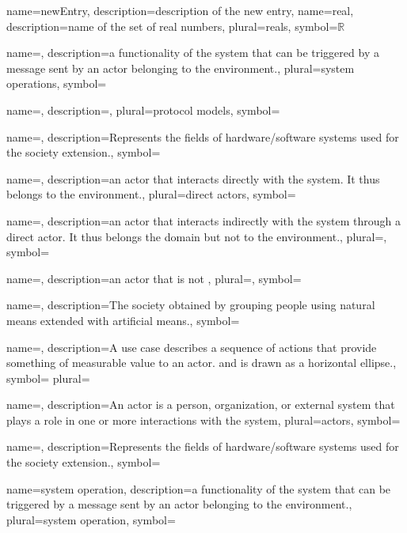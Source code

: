 {name={newEntry},
description={description of the new entry},
}
{name={real},
description={name of the set of real numbers},
plural={reals},
symbol={\ensuremath{\mathbb{R}}}
}

{name={},
description={a functionality of the system that can be triggered by a message sent by an actor belonging to the environment.},
plural={system operations},
symbol={}
}

{name={},
description={},
plural={protocol models},
symbol={}
}

{name={},
description={Represents the fields of hardware/software
systems used for the society extension.},
symbol={}
}

{name={},
description={an actor that interacts directly with the system. It thus belongs to the environment.},
plural={direct actors},
symbol={}
}

{name={},
description={an actor that interacts indirectly with the system through a direct actor. It thus belongs the domain but not to the environment.},
plural={},
symbol={}
}

{name={},
description={an actor that is not },
plural={},
symbol={}
}

{name={},
description={The society obtained by grouping people using natural means
extended with artificial means.},
symbol={} }

{name={},
description={A use case describes a sequence of actions that provide something
of measurable value to an actor. and is drawn as a horizontal ellipse.},
symbol={} 
plural={} }

{name={},
description={An actor is a person, organization, or external system that plays a role in one or more interactions with the system},
plural={actors},
symbol={}
}

{name={},
description={Represents the fields of hardware/software
systems used for the society extension.},
symbol={}
}

{name={system operation},
description={a functionality of the system that can be triggered by a message sent by an actor belonging to the environment.},
plural={system operation},
symbol={}
}




